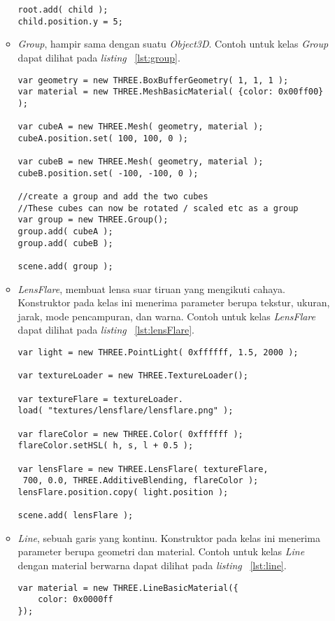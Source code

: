 \begin{itemize}
\begin{itemize}
\begin{lstlisting}[caption={Contoh penggunaan kelas {\it Bone}.}, label={lst:bone},captionpos=b]
root.add( child );
child.position.y = 5;
\end{lstlisting}
		\item {\it Group}, hampir sama dengan suatu {\it Object3D}. Contoh untuk kelas {\it Group} dapat dilihat pada {\it listing} ~\ref{lst:group}.
\begin{lstlisting}[caption={Contoh penggunaan kelas {\it Group}.}, label={lst:group},captionpos=b]
var geometry = new THREE.BoxBufferGeometry( 1, 1, 1 );
var material = new THREE.MeshBasicMaterial( {color: 0x00ff00} );

var cubeA = new THREE.Mesh( geometry, material );
cubeA.position.set( 100, 100, 0 );

var cubeB = new THREE.Mesh( geometry, material );
cubeB.position.set( -100, -100, 0 );

//create a group and add the two cubes
//These cubes can now be rotated / scaled etc as a group
var group = new THREE.Group();
group.add( cubeA );
group.add( cubeB );

scene.add( group );
\end{lstlisting}
		\item {\it LensFlare}, membuat lensa suar tiruan yang mengikuti cahaya. Konstruktor pada kelas ini menerima parameter berupa tekstur, ukuran, jarak, mode pencampuran, dan warna. Contoh untuk kelas {\it LensFlare} dapat dilihat pada {\it listing} ~\ref{lst:lensFlare}.
\begin{lstlisting}[caption={Contoh penggunaan kelas {\it LensFlare}.}, label={lst:lensFlare},captionpos=b]
var light = new THREE.PointLight( 0xffffff, 1.5, 2000 );

var textureLoader = new THREE.TextureLoader();

var textureFlare = textureLoader.
load( "textures/lensflare/lensflare.png" );

var flareColor = new THREE.Color( 0xffffff );
flareColor.setHSL( h, s, l + 0.5 );

var lensFlare = new THREE.LensFlare( textureFlare,
 700, 0.0, THREE.AdditiveBlending, flareColor );
lensFlare.position.copy( light.position );

scene.add( lensFlare );
\end{lstlisting}
		\item {\it Line}, sebuah garis yang kontinu. Konstruktor pada kelas ini menerima parameter berupa geometri dan material. Contoh untuk kelas {\it Line} dengan material berwarna dapat dilihat pada {\it listing} ~\ref{lst:line}.
\begin{lstlisting}[caption={Contoh penggunaan kelas {\it Line}.}, label={lst:line},captionpos=b]
var material = new THREE.LineBasicMaterial({
	color: 0x0000ff
});


\end{lstlisting}
\end{itemize}
\end{itemize}
